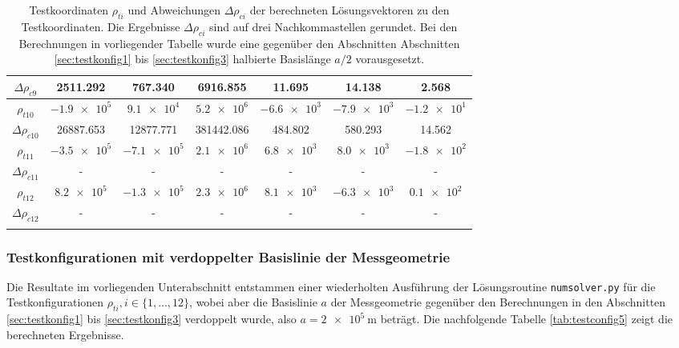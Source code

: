 \documentclass[a4paper,12pt]{article}
\numberwithin{equation}{section}
\begin{document}
\begin{longtable}{|c|c|c|c|c|c|c|}
$\Delta \rho_{c9}$ & 2511.292 & 767.340 & 6916.855 & 11.695 & 14.138 & 2.568 \\
\hline
$\rho_{t10}$ & $\num{-1.9e5}$ & $\num{9.1e4}$ & $\num{5.2e6}$ & $\num{-6.6e3}$ & $\num{-7.9e3}$ & $\num{-1.2e1}$ \\
$\Delta \rho_{c10}$ & 26887.653 & 12877.771 & 381442.086 & 484.802 & 580.293 & 14.562 \\
\hline
$\rho_{t11}$ & $\num{-3.5e5}$ & $\num{-7.1e5}$ & $\num{2.1e6}$ & $\num{6.8e3}$ & $\num{8.0e3}$ & $\num{-1.8e2}$ \\
$\Delta \rho_{c11}$ & - & - & - & - & - & - \\
\hline
$\rho_{t12}$ & $\num{8.2e5}$ & $\num{-1.3e5}$ & $\num{2.3e6}$ & $\num{8.1e3}$ & $\num{-6.3e3}$ & $\num{0.1e2}$ \\
$\Delta \rho_{c12}$ & - & - & - & - & - & - \\
\hline
\caption{Testkoordinaten $\rho_{ti}$ und Abweichungen $\Delta \rho_{ci}$ der berechneten Lösungsvektoren zu den Testkoordinaten. Die Ergebnisse $\Delta \rho_{ci}$ sind auf drei Nachkommastellen gerundet. Bei den Berechnungen in vorliegender Tabelle wurde eine gegenüber den Abschnitten Abschnitten \ref{sec:testkonfig1} bis \ref{sec:testkonfig3} halbierte Basislänge $a/2$ vorausgesetzt.}
\label{tab:testconfig4}
\end{longtable}
\renewcommand{\arraystretch}{1.0}

\FloatBarrier
\subsubsection{Testkonfigurationen mit verdoppelter Basislinie der Messgeometrie}\label{sec:testverdbasis}
Die Resultate im vorliegenden Unterabschnitt entstammen einer wiederholten Ausführung der Lösungsroutine \verb|numsolver.py| für die Testkonfigurationen $\rho_{ti}, i \in \{1,\dots,12\}$, wobei aber die Basislinie $a$ der Messgeometrie gegenüber den Berechnungen in den Abschnitten \ref{sec:testkonfig1} bis \ref{sec:testkonfig3} verdoppelt wurde, also $a = \SI{2e5}{\meter}$ beträgt. Die nachfolgende Tabelle \ref{tab:testconfig5} zeigt die berechneten Ergebnisse.
\end{document}
